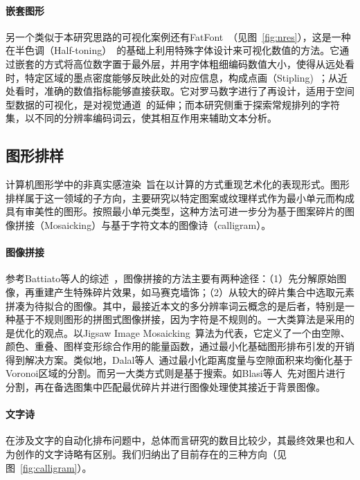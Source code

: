 \paragraph{嵌套图形}另一个类似于本研究思路的可视化案例还有FatFont~\supercite{Miguel2012}（见图~\ref{fig:nres}），这是一种在半色调（Half-toning）~\supercite{Ostromoukhov1995}的基础上利用特殊字体设计来可视化数值的方法。它通过嵌套的方式将高位数字置于最外层，并用字体粗细编码数值大小，使得从远处看时，特定区域的墨点密度能够反映此处的对应信息，构成点画（Stipling)~\supercite{Gortler2019}；从近处看时，准确的数值指标能够直接获取。它对罗马数字进行了再设计，适用于空间型数据的可视化，是对视觉通道~\supercite{Munzner2014}的延伸；而本研究侧重于探索常规排列的字符集，以不同的分辨率编码词云，使其相互作用来辅助文本分析。



\subsection{图形排样}
计算机图形学中的非真实感渲染~\supercite{ThomasStrothotte2002}旨在以计算的方式重现艺术化的表现形式。图形排样属于这一领域的子方向，主要研究以特定图案或纹理样式作为最小单元而构成具有审美性的图形。按照最小单元类型，这种方法可进一步分为基于图案碎片的图像拼接（Mosaicking）与基于字符文本的图像诗（calligram）。

\paragraph{图像拼接}参考Battiato等人的综述~\supercite{Battiato2007}，图像拼接的方法主要有两种途径：（1）先分解原始图像，再重建产生特殊碎片效果，如马赛克墙饰；（2）从较大的碎片集合中选取元素拼凑为待拟合的图像。其中，最接近本文的多分辨率词云概念的是后者，特别是一种基于不规则图形的拼图式图像拼接，因为字符是不规则的。一大类算法是采用的是优化的观点。以Jigsaw Image Mosaicking~\supercite{Kim2002}算法为代表，它定义了一个由空隙、颜色、重叠、图样变形综合作用的能量函数，通过最小化基础图形排布引发的开销得到解决方案。类似地，Dalal等人~\supercite{dalal2006}通过最小化距离度量与空隙面积来均衡化基于Voronoi区域的分割。而另一大类方式则是基于搜索。如Blasi等人~\supercite{Gallo2006}先对图片进行分割，再在备选图集中匹配最优碎片并进行图像处理使其接近于背景图像。

\paragraph{文字诗}在涉及文字的自动化排布问题中，总体而言研究的数目比较少，其最终效果也和人为创作的文字诗略有区别。我们归纳出了目前存在的三种方向（见图~\ref{fig:calligram}）。

